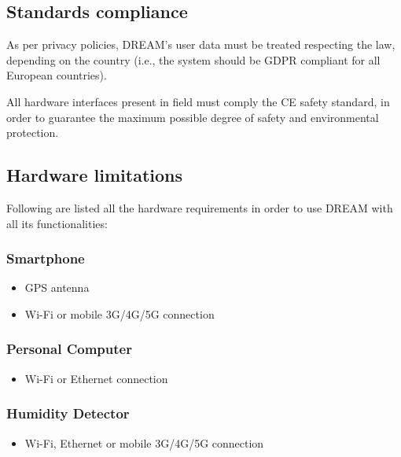 \documentclass[../../main.tex]{subfiles}
\begin{document}
	\subsection{Standards compliance}

	As per privacy policies, DREAM's user data must be treated respecting the law, depending on the 
	country (i.e., the system should be GDPR compliant for all European countries).

	All hardware interfaces present in field must comply the CE safety standard, in order to guarantee 
	the maximum possible degree of safety and environmental protection.

	\subsection{Hardware limitations}

	Following are listed all the hardware requirements in order to use DREAM with all its functionalities:

	\subsubsection*{Smartphone}
	\begin{itemize}

		\item GPS antenna

		\item Wi-Fi or mobile 3G/4G/5G connection

	\end{itemize}

	\subsubsection*{Personal Computer}
	\begin{itemize}

		\item Wi-Fi or Ethernet connection

	\end{itemize}

	\subsubsection*{Humidity Detector}
	\begin{itemize}

		\item Wi-Fi, Ethernet or mobile 3G/4G/5G connection

	\end{itemize}
\end{document}
